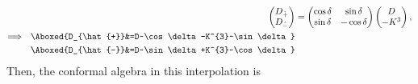\documentclass[]{article}
\numberwithin{equation}{section}
\begin{document}
{{\begin{align}
\begin{pmatrix}
    D_{\hat{+}}\\
    D_{\hat{-}}
  \end{pmatrix}&=
  \begin{pmatrix}
    \cos\delta   & \sin\delta \\
    \sin\delta   & -\cos\delta
  \end{pmatrix}
  \begin{pmatrix}
    D\\
    -K^{3}
  \end{pmatrix},\\
\Longrightarrow~~\Aboxed{D_{\hat{+}}&=D~\cos\delta-K^{3}~\sin\delta}\\
\Aboxed{D_{\hat{-}}&=D~\sin\delta+K^{3}~\cos\delta}
\end{align}
Then, the conformal algebra in this interpolation is

}}
\end{document}
